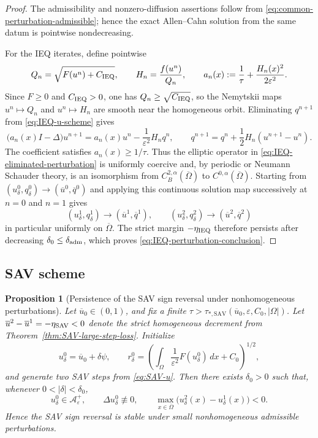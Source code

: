 \documentclass[final, 3p, times]{elsarticle}%
\newcommand{\eps}{\varepsilon}
\newcommand{\Aepsp}{\mathcal A_\varepsilon^+}
\newcommand{\Aeps}{\Aepsp}
\newtheorem{proposition}[theorem]{Proposition}
\begin{document}
\begin{proof}
The admissibility and nonzero-diffusion assertions follow from
\eqref{eq:common-perturbation-admissible}; hence the exact Allen--Cahn
solution from the same datum is pointwise nondecreasing.

For the IEQ iterates, define pointwise
\[
    Q_n=\sqrt{F(u^n)+C_{\rm IEQ}},
    \qquad H_n=\frac{f(u^n)}{Q_n},
    \qquad
    a_n(x):=\frac1\tau+\frac{H_n(x)^2}{2\eps^2}.
\]
Since $F\ge0$ and $C_{\rm IEQ}>0$, one has
$Q_n\ge\sqrt{C_{\rm IEQ}}$, so the Nemytskii maps
$u^n\mapsto Q_n$ and $u^n\mapsto H_n$ are smooth near the homogeneous
orbit. Eliminating $q^{n+1}$ from \eqref{eq:IEQ-u-scheme} gives
\begin{equation}
    \bigl(a_n(x)I-\Delta\bigr)u^{n+1}
    =a_n(x)u^n-\frac1{\eps^2}H_nq^n,
    \qquad
    q^{n+1}=q^n+\frac12H_n(u^{n+1}-u^n).
\label{eq:IEQ-eliminated-perturbation}
\end{equation}
The coefficient satisfies $a_n(x)\ge1/\tau$. Thus the elliptic operator
in \eqref{eq:IEQ-eliminated-perturbation} is uniformly coercive and, by
periodic or Neumann Schauder theory, is an isomorphism from
$C_B^{2,\alpha}(\overline\Omega)$ to
$C^{0,\alpha}(\overline\Omega)$. Starting from
$(u^0_\delta,q^0_\delta)\to(\overline u^0,\overline q^0)$ and applying
this continuous solution map successively at $n=0$ and $n=1$ gives
\[
    (u^1_\delta,q^1_\delta)\longrightarrow
    (\overline u^1,\overline q^1),
    \qquad
    (u^2_\delta,q^2_\delta)\longrightarrow
    (\overline u^2,\overline q^2)
\]
in particular uniformly on $\overline\Omega$. The strict margin
$-\eta_{\rm IEQ}$ therefore persists after decreasing
$\delta_0\le\delta_{\rm adm}$, which proves
\eqref{eq:IEQ-perturbation-conclusion}.
\end{proof}

\subsection{SAV scheme}
\label{sec:SAV-nonhomogeneous-persistence}

\begin{proposition}[Persistence of the SAV sign reversal under nonhomogeneous perturbations]
\label{prop:SAV-nonhomogeneous-persistence}
Let $\overline u_0\in(0,1)$, and fix a finite
$\tau>\tau_{*,\mathrm{SAV}}
(\overline u_0,\eps,C_0,|\Omega|)$. Let
$\overline u^2-\overline u^1=-\eta_{\rm SAV}<0$ denote the strict
homogeneous decrement from Theorem~\ref{thm:SAV-large-step-loss}. Initialize
\[
    u^0_\delta=\overline u_0+\delta\psi,
    \qquad
    r^0_\delta=
    \left(\int_\Omega\frac1{\eps^2}F(u^0_\delta)\,dx+C_0\right)^{1/2},
\]
and generate two SAV steps from \eqref{eq:SAV-u}. Then there exists
$\delta_0>0$ such that, whenever $0<|\delta|<\delta_0$,
\begin{equation}
    u^0_\delta\in\Aeps,
    \qquad
    \Delta u^0_\delta\not\equiv0,
    \qquad
    \max_{x\in\overline\Omega}
    \bigl(u^2_\delta(x)-u^1_\delta(x)\bigr)<0.
\label{eq:SAV-perturbation-conclusion}
\end{equation}
Hence the SAV sign reversal is stable under small nonhomogeneous
admissible perturbations.
\end{proposition}
\end{document}
